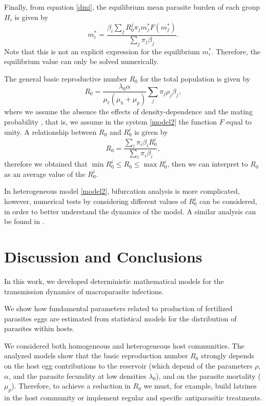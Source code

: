 \documentclass[eng]{MMSB-class-eng}
\begin{document}
{Finally, from equation \eqref{dmi},  the equilibrium mean parasite burden of each group $H_{i}$ is given by
\begin{equation}
m_{i}^*=\frac{\beta_{i}\sum_jR_0^j\pi_jm_j^* F(m_j^*)}{ \sum_j \pi_j\beta_{j}}.
\end{equation}
Note that this is not an explicit expression for the equilibrium $m_{i}^*$. Therefore, the equilibrium value can only be solved numerically.
}

The general basic reproductive number $R_0$ for the total population is given by %
\begin{equation}\label{valorR0}
R_{0}=\frac{\lambda_0 \alpha }
{ \mu_{\ell}(\mu_{h}+\mu_p)}
\sum_j \pi_j \rho_{j} \beta_{j},   
\end{equation}
where we assume the absence the effects of density-dependence and the mating probability \citep{anderson1992infectious}, that is, we assume in the system \eqref{model2} the function $F$ equal to unity.
A relationship between $R_0$ and $R_0^i$ is given by
\begin{equation}
R_{0}=\frac{\sum_i \pi_i\beta_{i}R_0^i}
{\sum_i \pi_i \beta_{i}},   
\end{equation}
therefore we obtained that $\min R_0^i\leq R_0 \leq \max R_0^i$, 
then we can interpret to $R_0$ as an average value of the $R_0^i$.

{\color{red}
In heterogeneous model \eqref{model2}, bifurcation analysis is more complicated, however,
numerical tests by considering different values of $R_0^i$ can be considered, in order to
better understand the dynamics of the model. A similar analysis can be found in \citep{burger2016modelling}.
}

\section{Discussion and Conclusions}

In this work, we developed deterministic mathematical models for the transmission dynamics of macroparasite infections. 

We show how fundamental parameters related to production of fertilized parasites eggs are estimated from statistical models for the distribution of
parasites within hosts.	

We considered both homogeneous and heterogeneous host communities. 
The analyzed models show that the basic reproduction number $R_0$ strongly depends 
on the
host egg contributions to the reservoir (which depend of the parameters $\rho$, $\alpha$, and the parasite fecundity at low densities $\lambda_0 $), and on the parasite mortality ($\mu_p$). 
Therefore, to achieve a reduction in $R_0$ we must, for example, build latrines in the host community or implement regular and specific antiparasitic treatments.
\end{document}
